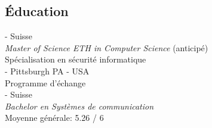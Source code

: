 \documentclass[mm]{simple_style}
\begin{document}
\begin{resume}
\section{\'Education}
 - Suisse \\
{\sl Master of Science ETH in Computer Science} (anticip\'e)\\
Sp\'ecialisation en s\'ecurit\'e informatique\\
 - Pittsburgh PA - USA \\
Programme d'\'echange\\
 - Suisse  \\
{\sl Bachelor en Syst\`emes de communication}\\Moyenne g\'en\'erale: 5.26 / 6\\
\sectionline

\end{resume}
\end{document}
